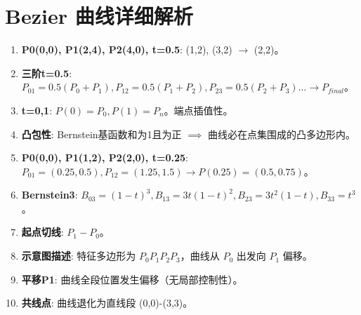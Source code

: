 \documentclass[UTF8]{ctexart}
\begin{document}
\section{Bezier 曲线详细解析}
\begin{enumerate}
    \item \textbf{P0(0,0), P1(2,4), P2(4,0), t=0.5}: (1,2), (3,2) $\to$ (2,2)。
    \item \textbf{三阶t=0.5}: $P_{01}=0.5(P_0+P_1), P_{12}=0.5(P_1+P_2), P_{23}=0.5(P_2+P_3) \dots \to P_{final}$。
    \item \textbf{t=0,1}: $P(0)=P_0, P(1)=P_n$。端点插值性。
    \item \textbf{凸包性}: Bernstein基函数和为1且为正 $\implies$ 曲线必在点集围成的凸多边形内。
    \item \textbf{P0(0,0), P1(1,2), P2(2,0), t=0.25}: $P_{01}=(0.25, 0.5), P_{12}=(1.25, 1.5) \to P(0.25)=(0.5, 0.75)$。
    \item \textbf{Bernstein3}: $B_{03}=(1-t)^3, B_{13}=3t(1-t)^2, B_{23}=3t^2(1-t), B_{33}=t^3$。
    \item \textbf{起点切线}: $P_1-P_0$。
    \item \textbf{示意图描述}: 特征多边形为 $P_0P_1P_2P_3$，曲线从 $P_0$ 出发向 $P_1$ 偏移。
    \item \textbf{平移P1}: 曲线全段位置发生偏移（无局部控制性）。
    \item \textbf{共线点}: 曲线退化为直线段 (0,0)-(3,3)。
\end{enumerate}
\end{document}
